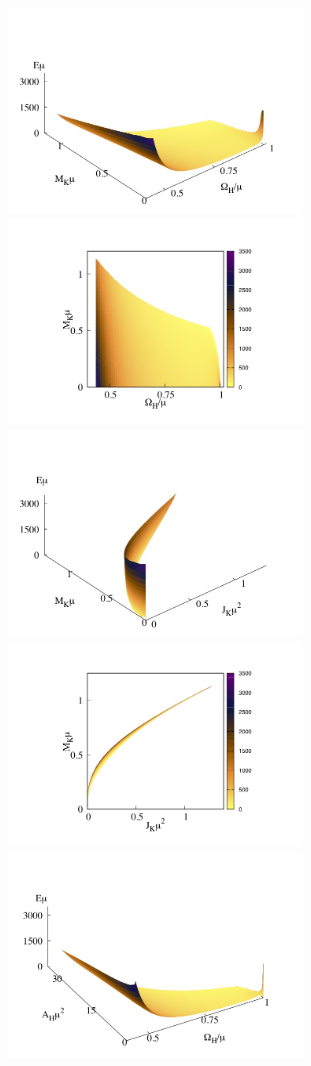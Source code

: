 \begin{figure}[h!]
\centering
\includegraphics[height=2.15in]{papers/QClouds/EMw-3D.jpeg}
\includegraphics[height=2.15in]{papers/QClouds/EMw-2D.jpeg}
\includegraphics[height=2.15in]{papers/QClouds/EMJ-3D.jpeg}
\includegraphics[height=2.15in]{papers/QClouds/EMJ-2D.jpeg}
\includegraphics[height=2.15in]{papers/QClouds/EAHw-3D.jpeg}

\end{figure}
